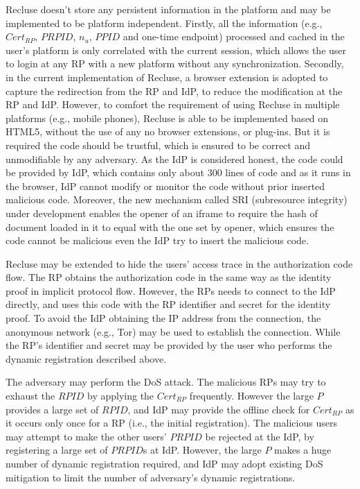 Recluse doesn't store any persistent information in the platform and may be implemented to be platform independent. Firstly, all the information (e.g., $Cert_{RP}$, $PRPID$, $n_u$, $PPID$ and one-time endpoint) processed and cached in the user's platform is only correlated with the current session, which allows the user to login at any RP with a new platform without any synchronization. Secondly, in the current implementation of Recluse, a browser extension is adopted to capture the redirection from the RP and IdP, to reduce the modification at the RP and IdP.
However, to comfort the requirement of using Recluse in multiple platforms (e.g., mobile phones), Recluse is able to be implemented based on HTML5, without the use of any no browser extensions, or plug-ins. But it is required the code should be trustful, which is ensured to be correct and unmodifiable by any adversary. As the IdP is considered honest, the code could be provided by IdP, which contains only about 300 lines of code and as it runs in the browser, IdP cannot modify or monitor the code without prior inserted malicious code. Moreover, the new mechanism called SRI (subresource integrity) under development enables the opener of an iframe to require the hash of document loaded in it to equal with the one set by opener, which ensures the code cannot be malicious even the IdP try to insert the malicious code.


 Recluse may be extended to hide the users' access trace in  the authorization code flow. The RP obtains the authorization code in the same way as the  identity proof in implicit protocol flow. However, the RPs needs to connect to the IdP directly, and  uses this code with  the RP identifier and secret for the identity proof. To avoid the IdP obtaining the IP address from the connection, the anonymous network (e.g., Tor) may be used to establish the connection. While the RP's identifier and secret may be provided by the user who performs the dynamic registration described above.

 The adversary may perform the DoS attack. The malicious RPs may try to exhaust the $RPID$  by applying the $Cert_{RP}$ frequently. However the large $P$ provides a large set of $RPID$, and IdP may provide the offline check for $Cert_{RP}$ as it occurs only once for a RP (i.e., the initial registration). The malicious users may attempt to make the other users' $PRPID$ be rejected at the IdP, by registering a large set of $PRPID$s at IdP. However, the large $P$ makes a huge number of dynamic registration required, and IdP may adopt existing DoS mitigation  to limit the number of adversary's dynamic registrations.

